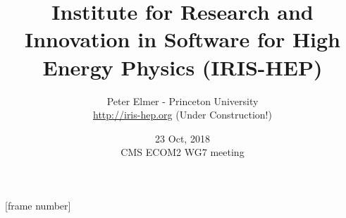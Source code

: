 \documentclass{beamer}
\title{Institute for Research and Innovation in Software for High Energy Physics (IRIS-HEP)}
\author{Peter Elmer - Princeton University \\
        \url{http://iris-hep.org} (Under Construction!)}
\date{23 Oct, 2018 \\ CMS ECOM2 WG7 meeting}
\begin{document}
\maketitle



%
%

[frame number]












%
\end{document}
